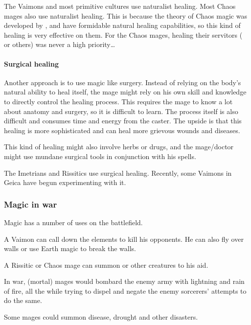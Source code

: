 The Vaimons and most primitive cultures use naturalist healing. Most Chaos mages also use naturalist healing. This is because the theory of Chaos magic was developed by \dragons{}, and \dragons{} have formidable natural healing capabilities, so this kind of healing is very effective on them. For the \draconic{} Chaos mages, healing their servitors (\scathae{} or others) was never a high priority\ldots{}





\paragraph{Surgical healing}
Another approach is to use magic like surgery. Instead of relying on the body's natural ability to heal itself, the mage might rely on his own skill and knowledge to directly control the healing process. This requires the mage to know a lot about anatomy and surgery, so it is difficult to learn. The process itself is also difficult and consumes time and energy from the caster. The upside is that this healing is more sophisticated and can heal more grievous wounds and diseases. 

This kind of healing might also involve herbs or drugs, and the mage/doctor might use mundane surgical tools in conjunction with his spells. 

The Imetrians and Rissitics use surgical healing. Recently, some Vaimons in Geica have begun experimenting with it. 





\subsubsection{Magic in war}
Magic has a number of uses on the battlefield. 

A Vaimon can call down the elements to kill his opponents. 
He can also fly over walls or use Earth magic to break the walls. 

A Rissitic or Chaos mage can summon  or other creatures to his aid. 

In war, (mortal) mages would bombard the enemy army with lightning and rain of fire, all the while trying to dispel and negate the enemy sorcerers' attempts to do the same. 

Some mages could summon disease, drought and other disasters.






